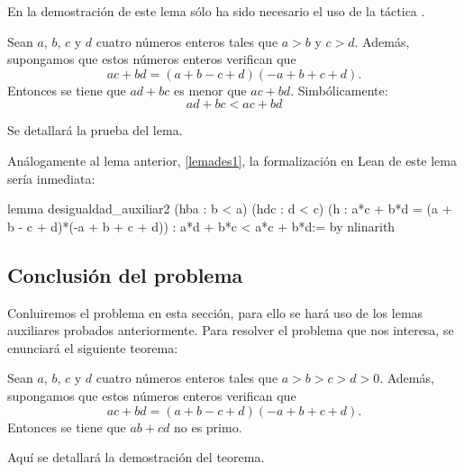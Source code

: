 En la demostración de este lema sólo ha sido necesario el uso de la táctica
.

\begin{lema}\label{lemades2}
  Sean \(a\), \(b\), \(c\) y \(d\) cuatro números enteros tales que
  \(a > b\) y \( c > d \). Además, supongamos que
  estos números enteros verifican que
    \begin{equation}
      ac+bd = (a+b-c+d)(-a+b+c+d).
    \end{equation}
    Entonces se tiene que \(ad+bc\) es menor que \(ac+bd\). Simbólicamente:
    \begin{equation}
      ad+bc<ac+bd
    \end{equation}
\end{lema}

\begin{demostracion}
  Se detallará la prueba del lema.
\end{demostracion}

Análogamente al lema anterior, \ref{lemades1}, la formalización en Lean de
este lema sería inmediata:
\begin{leancode}
lemma desigualdad_auxiliar2
  (hba : b < a)
  (hdc : d < c)
  (h : a*c + b*d = (a + b - c + d)*(-a + b + c + d))
  : a*d + b*c < a*c + b*d:=
by nlinarith
\end{leancode}

\subsection{Conclusión del problema}
Conluiremos el problema en esta sección, para ello se hará uso de los lemas
auxiliares probados anteriormente. Para resolver el problema que nos
interesa, se enunciará el siguiente teorema:

\begin{teorema}[imo2001q6]
  Sean \(a\), \(b\), \(c\) y \(d\) cuatro
  números enteros tales que \(a > b > c > d > 0\). Además, supongamos que
  estos números enteros verifican que
    \begin{equation}
      ac+bd = (a+b-c+d)(-a+b+c+d).
    \end{equation}
    Entonces se tiene que \(ab+cd\) no es primo.
\end{teorema}
\begin{demostracion}
  Aquí se detallará la demostración del teorema.
\end{demostracion}

